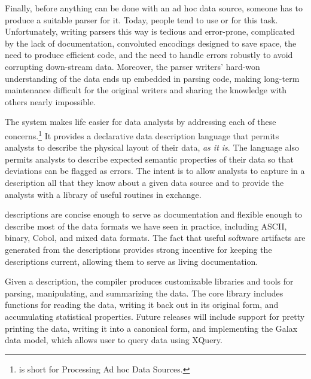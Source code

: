 Finally, before anything can be done with an ad hoc data source,
someone has to produce a suitable parser for it.
Today, people tend to use \C{} or \perl{} for this task.
Unfortunately, writing
parsers this way is tedious and error-prone, complicated by the lack
of documentation, convoluted encodings designed to save space, 
the need to produce efficient code,
and the need to handle errors robustly to avoid corrupting down-stream data.
Moreover, the parser writers' hard-won understanding of the data
ends up embedded in parsing code, making long-term maintenance
difficult for the original writers and sharing the knowledge with
others nearly impossible.

The \pads{} system makes life easier for data analysts by addressing
each of these concerns.\footnote{
  \pads{} is short for Processing Ad hoc Data Sources.
}
It provides a declarative data description
language that permits analysts to describe the physical layout of
their data, \textit{as it is}.  The language also permits analysts to
describe expected semantic properties of their data so that deviations can
be flagged as errors. The intent is to allow analysts to capture in a
\pads{} description all that they know about a given data source
and to provide the analysts with a library of useful routines in exchange. 


\pads{} descriptions are concise enough to
serve as documentation and flexible enough to describe most of
the data formats we have seen in practice, including ASCII, binary,
Cobol, and mixed data formats.  The fact that useful software
artifacts are generated from the descriptions provides strong
incentive for keeping the descriptions current, allowing them to serve
as living documentation.  

Given a \pads{} description, the \pads{} compiler produces
customizable \C{} libraries and tools for parsing, manipulating, and
summarizing the data. 
The core \C{} library includes functions for
reading the data, writing it back out in its original form, 
and accumulating statistical
properties.  
Future releases will include support for pretty printing the data,
writing it into a canonical \xml{} form, and implementing 
the Galax data model, which allows user to query \pads{} data using XQuery.

